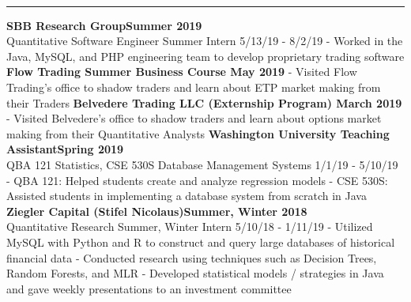 \documentclass[11pt]{article}
\begin{document}
\begin{titlepage}
\begin{addmargin}[1em]{0em}
\begin{center}
\begin{minipage}[b]{0.3\textwidth}
				\end{minipage}
			\end{center}
		\end{addmargin}
		\vspace{-10pt}
		\noindent
		\\\rule{\textwidth}{0.4pt}
		\begin{addmargin}[1em]{0em}
    		\textbf{SBB Research Group\hfill Summer 2019}\\
Quantitative Software Engineer Summer Intern \hfill {\small{5/13/19 - 8/2/19}}\newline
- Worked in the Java, MySQL, and PHP engineering team to develop proprietary trading software\newline
            \textbf{Flow Trading Summer Business Course \hfill May 2019}\newline
- Visited Flow Trading's office to shadow traders and learn about ETP market making from their Traders\newline
            \textbf{Belvedere Trading LLC (Externship Program) \hfill March 2019}\newline
- Visited Belvedere's office to shadow traders and learn about options market making from their Quantitative Analysts\newline
		    \textbf{Washington University Teaching Assistant\hfill Spring 2019}\\
QBA 121 Statistics, CSE 530S Database Management Systems \hfill {\small{1/1/19 - 5/10/19}}\newline
- QBA 121: Helped students create and analyze regression models\newline
- CSE 530S: Assisted students in implementing a database system from scratch in Java\newline
			\textbf{Ziegler Capital (Stifel Nicolaus)\hfill Summer, Winter 2018}\\
Quantitative Research Summer, Winter Intern \hfill {\small{5/10/18 - 1/11/19}}\newline
- Utilized MySQL with Python and R to construct and query large databases of historical financial data \newline
- Conducted research using techniques such as Decision Trees, Random Forests, and MLR\newline
- Developed statistical models / strategies in Java and gave weekly presentations to an investment committee\newline

\end{addmargin}
\end{titlepage}
\end{document}
